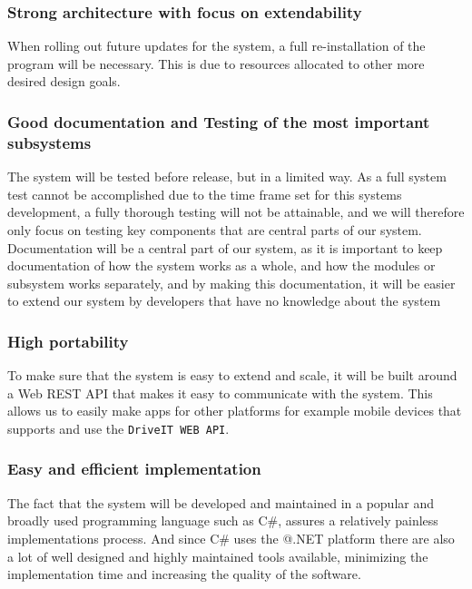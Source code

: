 \subsubsection{Strong architecture with focus on extendability}
When rolling out future updates for the system, a full re-installation of the program will be necessary. This is due to resources allocated to other more desired design goals.\\

\subsubsection{Good documentation and Testing of the most important subsystems}
The system will be tested before release, but in a limited way. As a full system test cannot be accomplished due to the time frame set for this systems development, a fully thorough testing will not be attainable, and we will therefore only focus on testing key components that are central parts of our system.
Documentation will be a central part of our system, as it is important to keep documentation of how the system works as a whole, and how the modules or subsystem works separately, and by making this documentation, it will be easier to extend our system by developers that have no knowledge about the system\\

\subsubsection{High portability}
To make sure that the system is easy to extend and scale, it will be built around a Web REST API that makes it easy to communicate with the system. This allows us to easily make apps for other platforms for example mobile devices that supports and use the \texttt{DriveIT WEB API}.\\

\subsubsection{Easy and efficient implementation}
The fact that the system will be developed and maintained in a popular and broadly used programming language such as C\#, assures a relatively painless implementations process. And since C\# uses the @.NET platform there are also a lot of well designed and highly maintained tools available, minimizing the implementation time and increasing the quality of the software.
